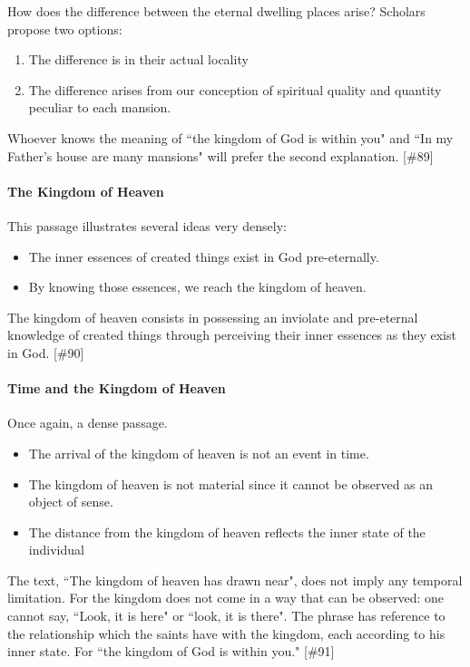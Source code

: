 \begin{quotex}
How does the difference between the eternal dwelling places arise? Scholars propose two options:

\end{quotex}
\begin{enumerate}
\item \begin{quotex}
The difference is in their actual locality 
\end{quotex}
\item \begin{quotex}
The difference arises from our conception of spiritual quality and quantity peculiar to each mansion. 
\end{quotex}
\end{enumerate}
\begin{quotex}
Whoever knows the meaning of ``the kingdom of God is within you" and ``In my Father's house are many
mansions" will prefer the second explanation. [\#89] 

\end{quotex}
\paragraph{The Kingdom of Heaven}
This passage illustrates several ideas very densely:

\begin{itemize}
\item The inner essences of created things exist in God pre-eternally. 
\item By knowing those essences, we reach the kingdom of heaven. 
\end{itemize}
\begin{quotex}
The kingdom of heaven consists in possessing an inviolate and pre-eternal knowledge of created things through perceiving
their inner essences as they exist in God. [\#90] 

\end{quotex}
\paragraph{Time and the Kingdom of Heaven}
Once again, a dense passage.

\begin{itemize}
\item The arrival of the kingdom of heaven is not an event in time. 
\item The kingdom of heaven is not material since it cannot be observed as an object of sense. 
\item The distance from the kingdom of heaven reflects the inner state of the individual 
\end{itemize}
\begin{quotex}
The text, ``The kingdom of heaven has drawn near", does not imply any temporal limitation. For the kingdom does not come
in a way that can be observed: one cannot say, ``Look, it is here" or ``look, it is there". The phrase has reference to
the relationship which the saints have with the kingdom, each according to his inner state. For ``the kingdom of God is
within you." [\#91] 

\end{quotex}
